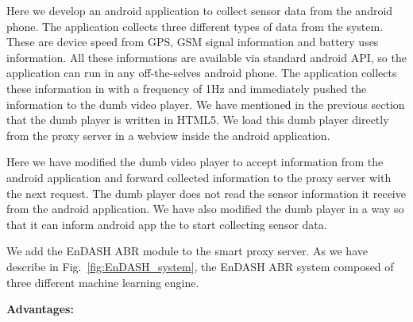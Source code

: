 Here we develop an android application to collect sensor data from the android phone. The application collects three different types of data from the system. These are device speed from GPS, GSM signal information and battery uses information. All these informations are available via standard android API, so the application can run in any off-the-selves android phone. The application collects these information in with a frequency of 1Hz and immediately pushed the information to the dumb video player. We have mentioned in the previous section that the dumb player is written in HTML5. We load this dumb player directly from the proxy server in a webview inside the android application.

Here we have modified the dumb video player to accept information from the android application and forward collected information to the proxy server with the next request. The dumb player does not read the sensor information it receive from the android application. We have also modified the dumb player in a way so that it can inform android app the to start collecting sensor data.

We add the EnDASH ABR module to the smart proxy server. As we have describe in Fig.~\ref{fig:EnDASH_system},  the EnDASH ABR system composed of three different machine learning engine. 

{\bf Advantages:}